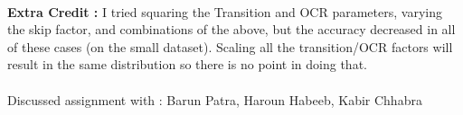 \documentclass[]{article}
\begin{document}
~\\
{\bfseries Extra Credit : } I tried squaring the Transition and OCR parameters, varying the skip factor, and combinations of the above, but the accuracy decreased in all of these cases (on the small dataset). Scaling all the transition/OCR factors will result in the same distribution so there is no point in doing that.
\\
\\
Discussed assignment with : Barun Patra, Haroun Habeeb, Kabir Chhabra
\end{document}
